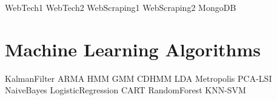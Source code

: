 \documentclass[nociteref]{SIAM-GH-book}
\begin{document}
{WebTech1}
{WebTech2}
{WebScraping1}
{WebScraping2}
{MongoDB}

\part{Machine Learning Algorithms} %
{KalmanFilter}
{ARMA}
{HMM}
{GMM}
{CDHMM}
{LDA}
{Metropolis}
{PCA-LSI}
{NaiveBayes}
{LogisticRegression}
{CART}
{RandomForest}
{KNN-SVM}
\end{document}
